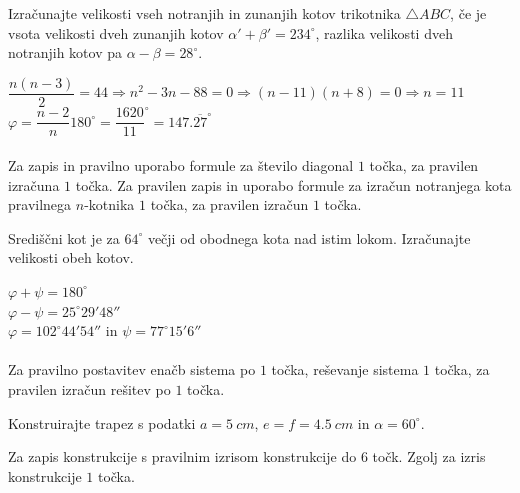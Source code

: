 \documentclass[addpoints]{exam}
\begin{document}
\begin{questions}


    \question[5]
        Izračunajte velikosti vseh notranjih in zunanjih kotov trikotnika $\triangle ABC$, 
        če je vsota velikosti dveh zunanjih kotov $\alpha'+\beta'=234^\circ$, razlika velikosti dveh notranjih kotov pa $\alpha-\beta=28^\circ$.

    \begin{solution}[10cm]
        $ \dfrac{n(n-3)}{2}=44 \Rightarrow n^2-3n-88=0 \Rightarrow (n-11)(n+8)=0 \Rightarrow n=11 $ \\
        $ \varphi=\dfrac{n-2}{n}180^\circ=\dfrac{1620}{11}^\circ=147.\overline{27}^\circ $ \\ \\
        Za zapis in pravilno uporabo formule za število diagonal $1$ točka, za pravilen izračuna $1$ točka. 
        Za pravilen zapis in uporabo formule za izračun notranjega kota pravilnega $n$-kotnika $1$ točka, za pravilen izračun $1$ točka.
    \end{solution}



    \question[3]
    Središčni kot je za $64^\circ$ večji od obodnega kota nad istim lokom. 
    Izračunajte velikosti obeh kotov.

    \begin{solution}[2cm]
        $\varphi+\psi=180^\circ$ \\
        $\varphi-\psi=25^\circ 29' 48''$ \\
        $\varphi=102^\circ 44' 54''$ in $\psi=77^\circ 15' 6 ''$ \\ \\
        Za pravilno postavitev enačb sistema po $1$ točka, reševanje sistema $1$ točka, za pravilen izračun rešitev po $1$ točka.
    \end{solution}

    

    \newpage

    \question[6]
    Konstruirajte trapez s podatki $a=5~cm$, $e=f=4.5~cm$ in $\alpha=60^\circ$.

    \begin{solution}[15cm]
        Za zapis konstrukcije s pravilnim izrisom konstrukcije do $6$ točk. Zgolj za izris konstrukcije $1$ točka.
    \end{solution}





\end{questions}
\end{document}

